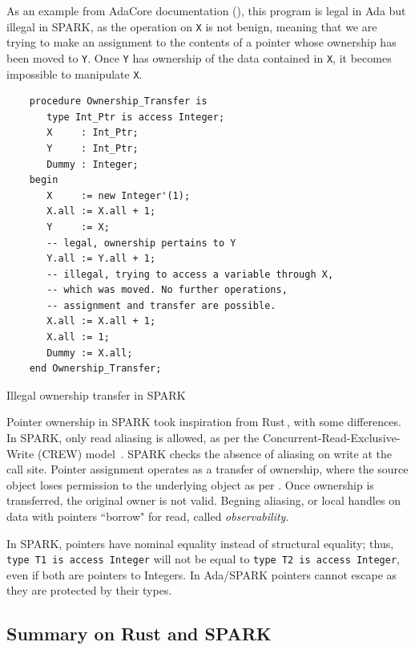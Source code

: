 \documentclass[nomenclature, english, bibtex]{kththesis}
\newcommand{\inlinecode}[1]{\texttt{#1}}
\begin{document}
As an example from AdaCore documentation (), this program is legal in Ada but illegal in SPARK, as the operation on \texttt{X} is not benign, meaning that we are trying to make an assignment to the contents of a pointer whose \gls{ownership} has been moved to \texttt{Y}. Once \texttt{Y} has ownership of the data contained in \texttt{X}, it becomes impossible to manipulate \texttt{X}.

\begin{listing}[!ht]
    \begin{verbatim}
    procedure Ownership_Transfer is
       type Int_Ptr is access Integer;
       X     : Int_Ptr;
       Y     : Int_Ptr;
       Dummy : Integer;
    begin
       X     := new Integer'(1);
       X.all := X.all + 1;
       Y     := X;
       -- legal, ownership pertains to Y
       Y.all := Y.all + 1;  
       -- illegal, trying to access a variable through X,
       -- which was moved. No further operations, 
       -- assignment and transfer are possible.
       X.all := X.all + 1;  
       X.all := 1;          
       Dummy := X.all;      
    end Ownership_Transfer;
    \end{verbatim}
    \caption[Illegal ownership transfer in SPARK]{Illegal ownership transfer in SPARK}
    \label{lstlisting:spark_illegal_transfer}
\end{listing}

Pointer ownership in SPARK took inspiration from Rust\,\cite{dross_using_2019}, with some differences. In SPARK, only read aliasing is allowed, as per the Concurrent-Read-Exclusive-Write (CREW) model~\cite{moy_proof_2019}. SPARK checks the absence of aliasing on write at the call site. Pointer assignment operates as a transfer of ownership, where the source object loses permission to the underlying object as per . Once ownership is transferred, the original owner is not valid. Begning aliasing, or local handles on data with pointers ``borrow" for read, called \emph{observability}.

In SPARK, pointers have nominal equality instead of structural equality; thus, \inlinecode{type T1 is access Integer} will not be equal to \inlinecode{type T2 is access Integer}, even if both are pointers to Integers. In Ada/SPARK pointers cannot escape as they are protected by their types. 


\subsection{Summary on Rust and SPARK}
\end{document}
